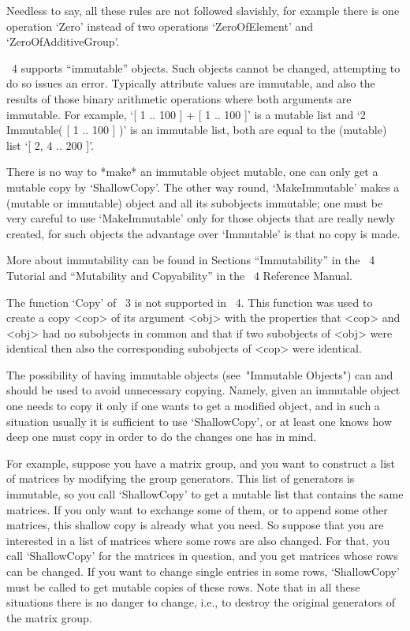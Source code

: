 Needless to say, all these rules are not followed slavishly,
for example there is one operation `Zero' instead of two operations
`ZeroOfElement' and `ZeroOfAdditiveGroup'.



{\GAP}~4 supports ``immutable'' objects.  Such objects cannot be
changed, attempting to do so issues an error.  Typically attribute
values are immutable, and also the results of those binary arithmetic
operations where both arguments are immutable.
For example, `[ 1 .. 100 ] + [ 1 .. 100 ]' is a
mutable list and `2 \* Immutable( [ 1 .. 100 ] )' is an immutable
list, both are equal to the (mutable) list `[ 2, 4 .. 200 ]'.

There is no way to *make* an immutable object mutable, one can only
get a mutable copy by `ShallowCopy'.  The other way round,
`MakeImmutable' makes a (mutable or immutable) object and all its
subobjects immutable; one must be very careful to use `MakeImmutable'
only for those objects that are really newly created, for such objects
the advantage over `Immutable' is that no copy is made.

More about immutability can be found in Sections ``Immutability'' in
the {\GAP}~4 Tutorial and ``Mutability and Copyability'' in the {\GAP}~4
Reference Manual.



The function `Copy' of {\GAP}~3 is not supported in {\GAP}~4.  This
function was used to create a copy <cop> of its argument <obj> with
the properties that <cop> and <obj> had no subobjects in common and
that if two subobjects of <obj> were identical then also the
corresponding subobjects of <cop> were identical.

The possibility of having immutable objects (see~"Immutable Objects") can and
should be used to avoid unnecessary copying.
Namely, given an immutable object one needs to copy it only if one wants
to get a modified object, and in such a situation usually it is
sufficient to use `ShallowCopy', or at least one knows how deep one must
copy in order to do the changes one has in mind.

For example, suppose you have a matrix group, and you want to
construct a list of matrices by modifying the group generators.  This
list of generators is immutable, so you call `ShallowCopy' to get a
mutable list that contains the same matrices.  If you only want to
exchange some of them, or to append some other matrices, this shallow
copy is already what you need.  So suppose that you are interested in
a list of matrices where some rows are also changed.  For that, you
call `ShallowCopy' for the matrices in question, and you get matrices
whose rows can be changed.  If you want to change single entries in
some rows, `ShallowCopy' must be called to get mutable copies of these
rows.  Note that in all these situations there is no danger to change,
i.e., to destroy the original generators of the matrix group.

